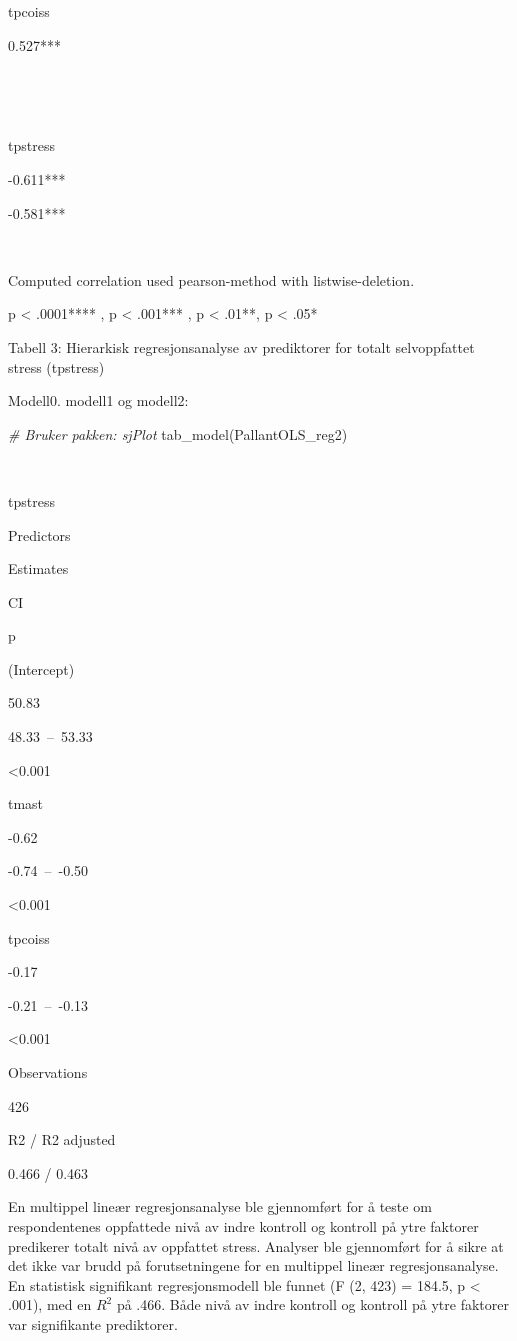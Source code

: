\documentclass[
]{article}
\newenvironment{Shaded}{\begin{snugshade}}{\end{snugshade}}
\newcommand{\CommentTok}[1]{\textcolor[rgb]{0.56,0.35,0.01}{\textit{#1}}}
\newcommand{\FunctionTok}[1]{\textcolor[rgb]{0.00,0.00,0.00}{#1}}
\newcommand{\NormalTok}[1]{#1}
\begin{document}
tpcoiss

0.527***

~

~

tpstress

-0.611***

-0.581***

~

Computed correlation used pearson-method with listwise-deletion.

p \textless{} .0001**** , p \textless{} .001*** , p \textless{} .01**, p \textless{} .05*

Tabell 3: Hierarkisk regresjonsanalyse av prediktorer for totalt selvoppfattet stress (tpstress)

Modell0. modell1 og modell2:

\begin{Shaded}
\begin{Highlighting}[]
\CommentTok{\# Bruker pakken: sjPlot}
\FunctionTok{tab\_model}\NormalTok{(PallantOLS\_reg2)}
\end{Highlighting}
\end{Shaded}

~

tpstress

Predictors

Estimates

CI

p

(Intercept)

50.83

48.33~--~53.33

\textless0.001

tmast

-0.62

-0.74~--~-0.50

\textless0.001

tpcoiss

-0.17

-0.21~--~-0.13

\textless0.001

Observations

426

R2 / R2 adjusted

0.466 / 0.463

En multippel lineær regresjonsanalyse ble gjennomført for å teste om respondentenes oppfattede nivå av indre kontroll og kontroll på ytre faktorer predikerer totalt nivå av oppfattet stress. Analyser ble gjennomført for å sikre at det ikke var brudd på forutsetningene for en multippel lineær regresjonsanalyse. En statistisk signifikant regresjonsmodell ble funnet (F (2, 423) = 184.5, p \textless{} .001), med en \(R^2\) på .466. Både nivå av indre kontroll og kontroll på ytre faktorer var signifikante prediktorer.
\end{document}
